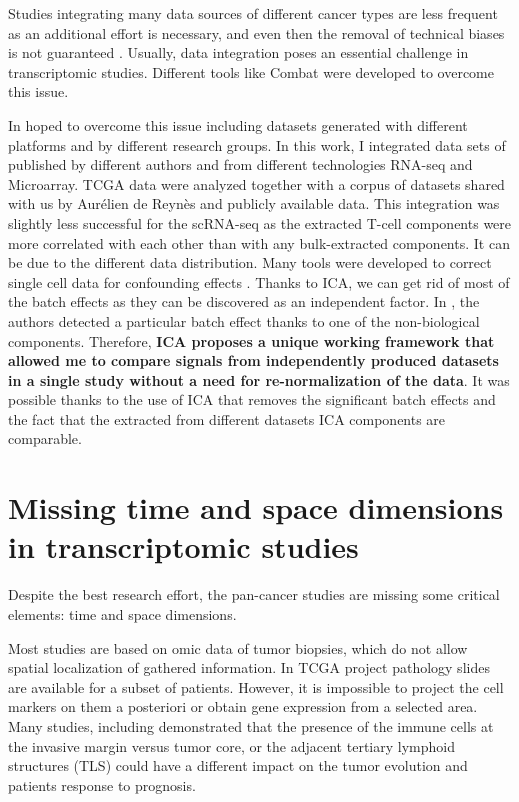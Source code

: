\documentclass[12pt,]{book}
\theoremstyle{definition}
\theoremstyle{definition}
\theoremstyle{definition}
\theoremstyle{remark}
\begin{document}
Studies integrating many data sources \citep{Kairov2017, Biton2014} of
different cancer types are less frequent as an additional effort is
necessary, and even then the removal of technical biases is not
guaranteed \citep{Battke2011}. Usually, data integration poses an
essential challenge in transcriptomic studies\citep{Battke2011}.
Different tools like Combat \citep{Johnson2007} were developed to
overcome this issue.

In hoped to overcome this issue including datasets generated with
different platforms and by different research groups. In this work, I
integrated data sets of published by different authors and from
different technologies RNA-seq and Microarray. TCGA data were analyzed
together with a corpus of datasets shared with us by Aurélien de Reynès
and publicly available data. This integration was slightly less
successful for the scRNA-seq as the extracted T-cell components were
more correlated with each other than with any bulk-extracted components.
It can be due to the different data distribution. Many tools were
developed to correct single cell data for confounding effects
\citep{Wang2017, Kharchenko2014, Yuan2017}. Thanks to ICA, we can get
rid of most of the batch effects as they can be discovered as an
independent factor. In \citep{Biton2014}, the authors detected a
particular batch effect thanks to one of the non-biological components.
Therefore, \textbf{ICA proposes a unique working framework that allowed
me to compare signals from independently produced datasets in a single
study without a need for re-normalization of the data}. It was possible
thanks to the use of ICA that removes the significant batch effects and
the fact that the extracted from different datasets ICA components are
comparable.

\hypertarget{missing-time-and-space-dimensions-in-transcriptomic-studies}{%
\section{Missing time and space dimensions in transcriptomic
studies}\label{missing-time-and-space-dimensions-in-transcriptomic-studies}}

Despite the best research effort, the pan-cancer studies are missing
some critical elements: time and space dimensions.

Most studies are based on omic data of tumor biopsies, which do not
allow spatial localization of gathered information. In TCGA project
pathology slides are available for a subset of patients. However, it is
impossible to project the cell markers on them a posteriori or obtain
gene expression from a selected area. Many studies, including
\citep{Bindea2011, Galon2016, Dieu-Nosjean2014, Sautes-Fridman2016}
demonstrated that the presence of the immune cells at the invasive
margin versus tumor core, or the adjacent tertiary lymphoid structures
(TLS) could have a different impact on the tumor evolution and patients
response to prognosis.
\end{document}
